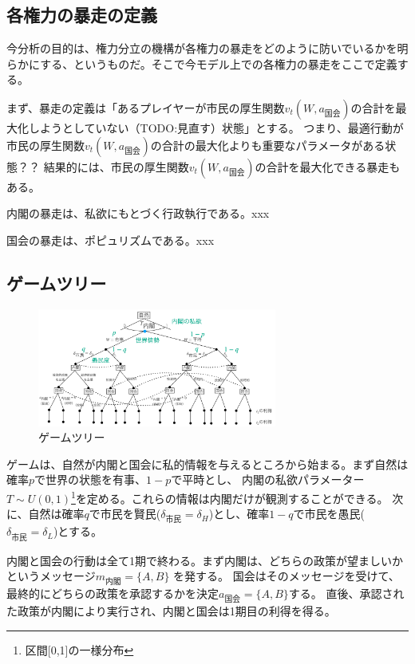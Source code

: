 \documentclass[main.tex]{subfiles}
\begin{document}
\subsection{各権力の暴走の定義}
今分析の目的は、権力分立の機構が各権力の暴走をどのように防いでいるかを明らかにする、というものだ。そこで今モデル上での各権力の暴走をここで定義する。

まず、暴走の定義は「あるプレイヤーが市民の厚生関数$v_t(W, a_{国会})$の合計を最大化しようとしていない（TODO:見直す）状態」とする。
つまり、最適行動が市民の厚生関数$v_t(W, a_{国会})$の合計の最大化よりも重要なパラメータがある状態？？
結果的には、市民の厚生関数$v_t(W, a_{国会})$の合計を最大化できる暴走もある。

内閣の暴走は、私欲にもとづく行政執行である。xxx

国会の暴走は、ポピュリズムである。xxx



\subsection{ゲームツリー}

\begin{figure}[htbp]
  \centering
  \includegraphics[width=0.7\textwidth]{./image/game_tree.png}
  \caption{ゲームツリー} 
  \label{fig:assumption_welfare_policy}
\end{figure}



ゲームは、自然が内閣と国会に私的情報を与えるところから始まる。まず自然は確率$p$で世界の状態を有事、$1-p$で平時とし、
内閣の私欲パラメーター$T\sim U(0,1)$\footnote{区間[0,1]の一様分布}を定める。これらの情報は内閣だけが観測することができる。
次に、自然は確率$q$で市民を賢民($\delta_{市民}=\delta_H$)とし、確率$1-q$で市民を愚民($\delta_{市民}=\delta_L$)とする。

内閣と国会の行動は全て1期で終わる。まず内閣は、どちらの政策が望ましいかというメッセージ$m_{内閣} = \lbrace A, B \rbrace$ を発する。
国会はそのメッセージを受けて、最終的にどちらの政策を承認するかを決定$a_{国会} = \lbrace A, B\rbrace$する。
直後、承認された政策が内閣により実行され、内閣と国会は1期目の利得を得る。
\end{document}
